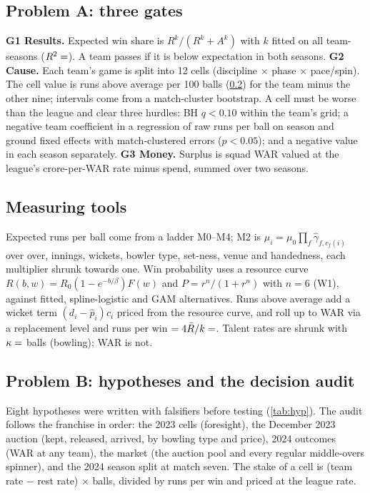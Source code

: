 \documentclass[10pt,twocolumn,letterpaper]{article}
\begin{document}
\subsection{Problem A: three gates}
\textbf{G1 Results.} Expected win share is $R^k/(R^k+A^k)$ with $k$ fitted on all team-seasons ($R^2=\kv{pythr2}$). A team passes if it is below expectation in both seasons. \textbf{G2 Cause.} Each team's game is split into 12 cells (discipline $\times$ phase $\times$ pace/spin). The cell value is runs above average per 100 balls (\cref{sec:tools}) for the team minus the other nine; intervals come from a match-cluster bootstrap. A cell must be worse than the league and clear three hurdles: BH $q<0.10$ within the team's grid; a negative team coefficient in a regression of raw runs per ball on season and ground fixed effects with match-clustered errors ($p<0.05$); and a negative value in each season separately. \textbf{G3 Money.} Surplus is squad WAR valued at the league's crore-per-WAR rate minus spend, summed over two seasons.

\subsection{Measuring tools}\label{sec:tools}
Expected runs per ball come from a ladder M0--M4; M2 is $\mu_i=\mu_0\prod_f\hat\gamma_{f,c_f(i)}$ over over, innings, wickets, bowler type, set-ness, venue and handedness, each multiplier shrunk towards one. Win probability uses a resource curve $R(b,w)=R_0(1-e^{-b/\beta})F(w)$ and $P=r^n/(1+r^n)$ with $n=6$ (W1), against fitted, spline-logistic and GAM alternatives. Runs above average add a wicket term $(d_i-\hat p_i)c_i$ priced from the resource curve, and roll up to WAR via a replacement level and runs per win $=4\bar R/k=\kv{rpw}$. Talent rates are shrunk with $\kappa=\kv{kbowl}$ balls (bowling); WAR is not.

\subsection{Problem B: hypotheses and the decision audit}
Eight hypotheses were written with falsifiers before testing (\cref{tab:hyp}). The audit follows the franchise in order: the 2023 cells (foresight), the December 2023 auction (kept, released, arrived, by bowling type and price), 2024 outcomes (WAR at any team), the market (the auction pool and every regular middle-overs spinner), and the 2024 season split at match seven. The stake of a cell is (team rate $-$ rest rate) $\times$ balls, divided by runs per win and priced at the league rate.
\end{document}
